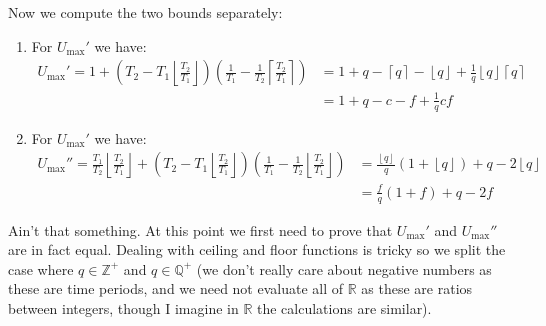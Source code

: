 \documentclass[a4paper,11pt]{article}
\begin{document}
Now we compute the two bounds separately:
\begin{enumerate}
	\item For $U_\text{max}'$ we have:
	      $$
		      \begin{aligned}
			      U_\text{max}' = 1 + \left( T_2 - T_1 \left\lfloor \frac{T_2}{T_1} \right\rfloor \right) \left( \frac{1}{T_1} - \frac{1}{T_2} \left\lceil \frac{T_2}{T_1} \right\rceil \right) & = 1 + q - \left\lceil q \right\rceil - \left\lfloor q \right\rfloor + \frac{1}{q} \left\lfloor q \right\rfloor \left\lceil q \right\rceil \\
			                                                                                                                                                                                    & = 1 + q - c - f + \frac{1}{q} cf
		      \end{aligned}
	      $$

	\item For $U_\text{max}'$ we have:
	      $$
		      \begin{aligned}
			      U_\text{max}'' = \frac{T_1}{T_2}\left\lfloor \frac{T_2}{T_1} \right\rfloor + \left( T_2 - T_1 \left\lfloor \frac{T_2}{T_1} \right\rfloor \right) \left( \frac{1}{T_1} - \frac{1}{T_2} \left\lfloor \frac{T_2}{T_1} \right\rfloor \right) & = \frac{\left\lfloor q \right\rfloor}{q} \left( 1 + \left\lfloor q \right\rfloor \right) + q - 2 \left\lfloor q \right\rfloor \\
			                                                                                                                                                                                                                                               & = \frac{f}{q}(1 + f) + q - 2f
		      \end{aligned}
	      $$
\end{enumerate}

Ain't that something.
At this point we first need to prove that $U_\text{max}'$ and $U_\text{max}''$ are in fact equal.
Dealing with ceiling and floor functions is tricky so we split the case where $q \in \mathbb{Z}^+$ and $q \in \mathbb{Q}^+$ (we don't really care about negative numbers as these are time periods, and we need not evaluate all of $\mathbb{R}$ as these are ratios between integers, though I imagine in $\mathbb{R}$ the calculations are similar).
\end{document}
